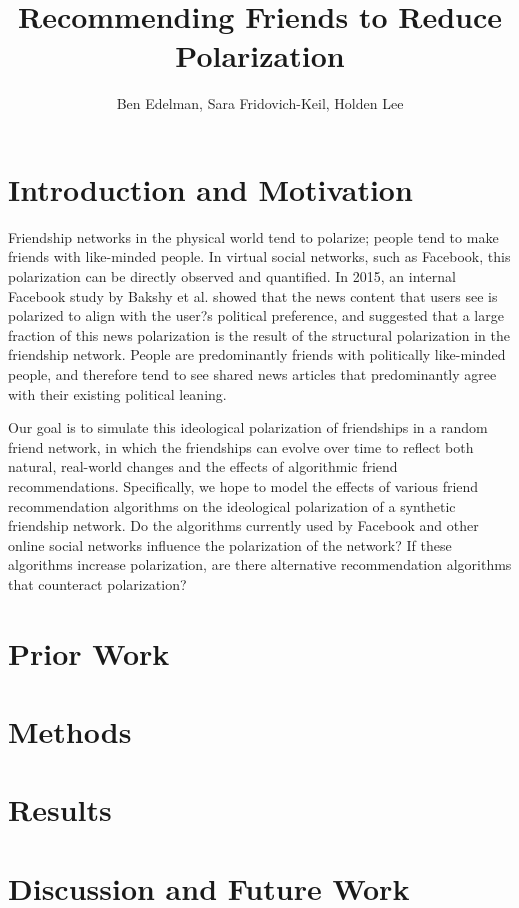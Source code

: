 \documentclass[12pt,letterpaper]{article}
\author{Ben Edelman, Sara Fridovich-Keil, Holden Lee}
\title{Recommending Friends to Reduce Polarization}
\begin{document}
\maketitle

\section{Introduction and Motivation}
Friendship networks in the physical world tend to polarize; people tend to make friends with like-minded people. In virtual social networks, such as Facebook, this polarization can be directly observed and quantified. In 2015, an internal Facebook study by Bakshy et al. \cite{bakshy} showed that the news content that users see is polarized to align with the user?s political preference, and suggested that a large fraction of this news polarization is the result of the structural polarization in the friendship network. People are predominantly friends with politically like-minded people, and therefore tend to see shared news articles that predominantly agree with their existing political leaning. 

Our goal is to simulate this ideological polarization of friendships in a random friend network, in which the friendships can evolve over time to reflect both natural, real-world changes and the effects of algorithmic friend recommendations. Specifically, we hope to model the effects of various friend recommendation algorithms on the ideological polarization of a synthetic friendship network. Do the algorithms currently used by Facebook and other online social networks influence the polarization of the network? If these algorithms increase polarization, are there alternative recommendation algorithms that counteract polarization? 


\section{Prior Work}

\section{Methods}

\section{Results}

\section{Discussion and Future Work}
\end{document}
